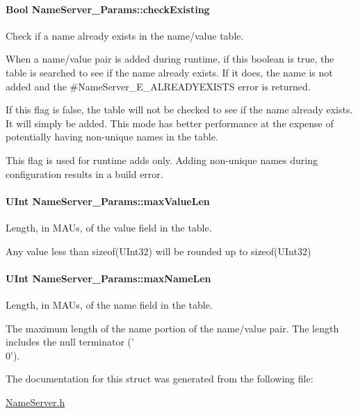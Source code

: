 \paragraph[{check\-Existing}]{\setlength{\rightskip}{0pt plus 5cm}Bool Name\-Server\-\_\-\-Params\-::check\-Existing}\label{struct_name_server___params_ac1accae9db70ea330e40c8da8d311eab}
Check if a name already exists in the name/value table. \begin{DoxyVerb}   When a name/value pair is added during runtime, if this boolean is
   true, the table is searched to see if the name already exists. If
   it does, the name is not added and the 
   #NameServer_E_ALREADYEXISTS error is returned.

   If this flag is false, the table will not be checked to see if the
   name already exists. It will simply be added. This mode has better
   performance at the expense of potentially having non-unique names
   in the table.

   This flag is used for runtime adds only. Adding non-unique names during
   configuration results in a build error.\end{DoxyVerb}
\paragraph[{max\-Value\-Len}]{\setlength{\rightskip}{0pt plus 5cm}U\-Int Name\-Server\-\_\-\-Params\-::max\-Value\-Len}\label{struct_name_server___params_afa31d4aaa38615278dd7d8b25603bf5d}
Length, in M\-A\-Us, of the value field in the table. \begin{DoxyVerb}   Any value less than sizeof(UInt32) will be rounded up to sizeof(UInt32)\end{DoxyVerb}
\paragraph[{max\-Name\-Len}]{\setlength{\rightskip}{0pt plus 5cm}U\-Int Name\-Server\-\_\-\-Params\-::max\-Name\-Len}\label{struct_name_server___params_a8fcc951ae29abaa33f11360cc4fa6441}
Length, in M\-A\-Us, of the name field in the table. \begin{DoxyVerb}   The maximum length of the name portion of the name/value
   pair.  The length includes the null terminator ('\\0').\end{DoxyVerb}
 

The documentation for this struct was generated from the following file\-:\begin{DoxyCompactItemize}
\item 
\hyperlink{_name_server_8h}{Name\-Server.\-h}\end{DoxyCompactItemize}

